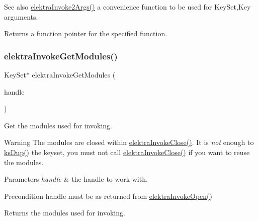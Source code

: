\begin{DoxySeeAlso}{See also}
\hyperlink{group__invoke_gaa257d93399c60f73c611205bbfa7c9a0}{elektra\+Invoke2\+Args()} a convenience function to be used for Key\+Set,Key arguments.
\end{DoxySeeAlso}
\begin{DoxyReturn}{Returns}
a function pointer for the specified function. 
\end{DoxyReturn}
\mbox{\label{group__invoke_gaf3564011b52e96c9754a7b9bc41ea478}} 
\subsubsection{\texorpdfstring{elektra\+Invoke\+Get\+Modules()}{elektraInvokeGetModules()}}
{\footnotesize\ttfamily Key\+Set$\ast$ elektra\+Invoke\+Get\+Modules (\begin{DoxyParamCaption}\item[{Elektra\+Invoke\+Handle $\ast$}]{handle }\end{DoxyParamCaption})}



Get the modules used for invoking. 

\begin{DoxyWarning}{Warning}
The modules are closed within \hyperlink{group__invoke_ga684a21daa0b3c20783c55184a9157b3b}{elektra\+Invoke\+Close()}. It is {\itshape not} enough to \hyperlink{group__keyset_gac59e4b328245463f1451f68d5106151c}{ks\+Dup()} the keyset, you must not call \hyperlink{group__invoke_ga684a21daa0b3c20783c55184a9157b3b}{elektra\+Invoke\+Close()} if you want to reuse the modules.
\end{DoxyWarning}

\begin{DoxyParams}{Parameters}
{\em handle} & the handle to work with.\\
\hline
\end{DoxyParams}
\begin{DoxyPrecond}{Precondition}
handle must be as returned from \hyperlink{group__invoke_ga3eb20131e9a8fc9a6cebf126927c09bc}{elektra\+Invoke\+Open()}
\end{DoxyPrecond}
\begin{DoxyReturn}{Returns}
the modules used for invoking. 
\end{DoxyReturn}
\mbox{\label{group__invoke_gafc090b80f3ba846bf3c3fd8ccd34f2f5}} 
